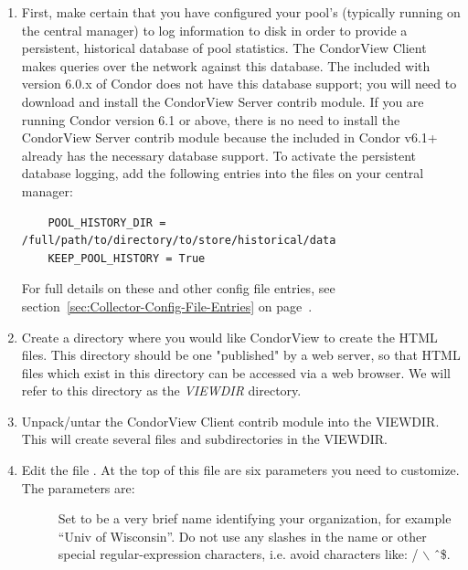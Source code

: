 \begin{enumerate}

\item First, make certain that you have configured your pool's
 (typically running on the central manager) to log
information to disk in order to provide a persistent, historical
database of pool statistics.  
The CondorView Client makes queries over the network against this
database.  The  included with version 6.0.x of Condor
does not have this database support; you will need to download and
install the CondorView Server contrib module.  
If you are running Condor
version 6.1 or above, there is no need to install the CondorView Server
contrib module because the  included in Condor v6.1+
already has the necessary database support.  
To activate the persistent database logging, add the following entries into
the  files on your central manager: 
\begin{verbatim}
    POOL_HISTORY_DIR = /full/path/to/directory/to/store/historical/data 
    KEEP_POOL_HISTORY = True 
\end{verbatim}
For full details on these and other  config file
entries, see section~\ref{sec:Collector-Config-File-Entries} on
page~\pageref{sec:Collector-Config-File-Entries}.

\item Create a directory where you would like CondorView to create the
HTML files.  
This directory should be one "published" by a web server, so that HTML
files which exist in this directory can be accessed via a web browser.  
We will refer to this directory as the \emph{VIEWDIR} directory.

\item Unpack/untar the CondorView Client contrib module into the VIEWDIR.
This will create several files and subdirectories in the VIEWDIR.

\item Edit the file \MakeStats.  At the top of this file are six parameters
you need to customize.  The parameters are:

\begin{description}

	\item[] Set to be a very brief name identifying
	your organization, for example ``Univ of Wisconsin''.  Do not
	use any slashes in the name or other special regular-expression
	characters, i.e. avoid characters like: / $\backslash$ \^\ \$.


\end{description}
\end{enumerate}
